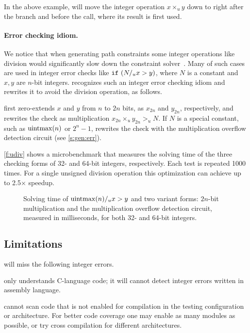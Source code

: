 In the above example, \sys will move the integer operation $x
\times_u y$ down to right after the  branch and before the
 call, where its result  is first used.

\paragraph{Error checking idiom.}

We notice that when generating path constraints some integer
operations like division would significantly slow down the constraint
solver~\cite{brummayer:perf}.  Many of such cases are used in integer
error checks like $\texttt{if}\ (N /_u x > y)$, where $N$ is a constant
and $x, y$ are $n$-bit integers.  \sys recognizes such an integer
error checking idiom and rewrites it to avoid the division operation,
as follows.

\sys first zero-extends $x$ and $y$ from $n$ to $2n$
bits, as $x_{2n}$ and $y_{2n}$, respectively, and rewrites the check
as multiplication $x_{2n} \times_u y_{2n} >_u N$.  If $N$ is a
special constant, such as $\operatorname{uintmax}(n)$ or $2^n-1$, \sys rewrites
the check with the multiplication overflow detection circuit (see
\autoref{s:gen:err}).

\autoref{f:udiv} shows a microbenchmark that measures the solving
time of the three checking forms of 32- and 64-bit integers,
respectively.  Each test is repeated 1000 times.  For a single
unsigned division operation this optimization can achieve up to
2.5$\times$ speedup.

\begin{figure}
\centering

\caption{Solving time of $\operatorname{uintmax}(n) /_u x > y$ and two variant
forms: $2n$-bit multiplication and the multiplication overflow
detection circuit, measured in milliseconds, for both 32- and 64-bit
integers.}
\label{f:udiv}
\end{figure}

\subsection{Limitations}
\label{s:gen:limit}

\sys will miss the following integer errors.

\sys only understands C-language code; it will cannot detect integer
errors written in assembly language.

\sys cannot scan code that is not enabled for compilation in the
testing configuration or architecture.  For better code coverage
one may enable as many modules as possible, or try cross compilation
for different architectures.

